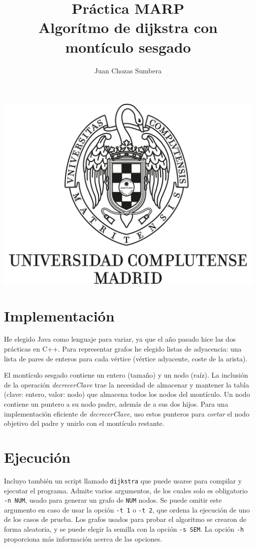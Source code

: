 \documentclass[12pt , a4paper]{article}
\title{Práctica MARP\\Algorítmo de dijkstra con montículo sesgado}
\author{Juan Chozas Sumbera}
\begin{document}
	
	\maketitle
	\begin{center}
		\includegraphics[width=\textwidth]{logo_UCM.jpg}
	\end{center}
	
	\newpage
	
\section{Implementación}
	
	He elegido Java como lenguaje para variar, ya que el año pasado hice las dos prácticas en C++. Para representar grafos he elegido listas de adyacencia: una lista de pares de enteros para cada vértice (vértice adyacente, coste de la arista).
	
	El montículo sesgado contiene un entero (tamaño) y un nodo (raíz). La inclusión de la operación \textit{decrecerClave} trae la necesidad de almacenar y mantener la tabla (clave: entero, valor: nodo) que almacena todos los nodos del montículo. Un nodo contiene un puntero a su nodo padre, además de a sus dos hijos. Para una implementación eficiente de \textit{decrecerClave}, uso estos punteros para \textit{cortar} el nodo objetivo del padre y unirlo con el montículo restante.
	
\section{Ejecución}
	Incluyo también un script llamado \texttt{dijkstra} que puede usarse para compilar y ejecutar el programa. Admite varios argumentos, de los cuales solo es obligatorio \texttt{-n NUM}, usado para generar un grafo de \texttt{NUM} nodos. Se puede omitir este argumento en caso de usar la opción \texttt{-t 1} o \texttt{-t 2}, que ordena la ejecución de uno de los casos de prueba. Los grafos usados para probar el algoritmo se crearon de forma aleatoria, y se puede elegir la semilla con la opción \texttt{-s SEM}. La opción \texttt{-h} proporciona más información acerca de las opciones.
	
\end{document}
